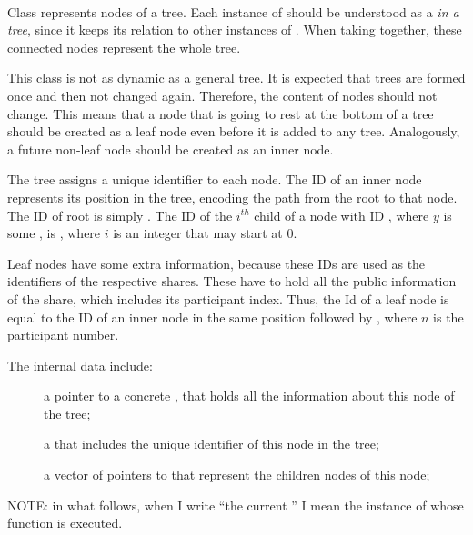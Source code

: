 \documentclass{article}
\begin{document}
\paragraph{\ctree}

Class \ctree represents nodes of a tree. Each instance of \ctree should be understood as a \cnode \emph{in a tree}, since it keeps its relation to other instances of \ctree. When taking together, these connected nodes represent the whole tree.

This class is not as dynamic as a general tree. It is expected that trees are formed once and then not changed again. Therefore, the content of nodes should not change. This means that a node that is going to rest at the bottom of a tree should be created as a leaf node even before it is added to any tree. Analogously, a future non-leaf node should be created as an inner node.

The tree assigns a unique identifier to each node. The ID of an inner node represents its position in the tree, encoding the path from the root to that node. The ID of root is simply . The ID of the $i^{th}$ child of a node with ID , where $y$ is some \cstring, is , where $i$ is an integer that may start at $0$.

Leaf nodes have some extra information, because these IDs are used as the identifiers of the respective shares. These have to hold all the public information of the share, which includes its participant index. Thus, the Id of a leaf node is equal to the ID of an inner node in the same position followed by , where $n$ is the participant number.

The internal data include:

\begin{description}
\item[] a pointer to a concrete \cnode, that holds all the information about this node of the tree;
\item[] a \cstring that includes the unique identifier of this node in the tree;
\item[] a vector of pointers to \ctree that represent the children nodes of this node;
\end{description}

NOTE: in what follows, when I write ``the current \ctree'' I mean the instance of \ctree whose function is executed.
\end{document}
